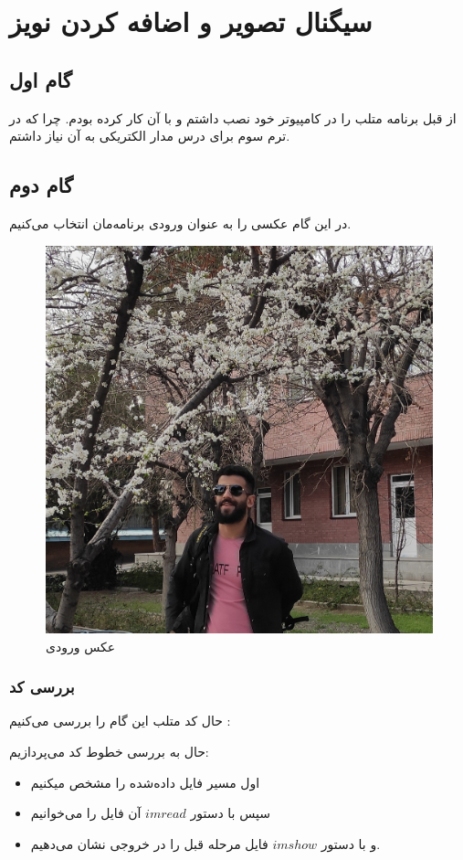 
\def \Subject {سیگنال تصویر و اضافه کردن نویز}
\def \Author {فرزان رحمانی}
\def \Session {1}
\setcounter{chapter}{\Session-1}

\chapter[\Subject]{\Subject}
\section{گام اول}
از قبل برنامه متلب را در کامپیوتر خود نصب داشتم و با آن کار کرده بودم. چرا که در ترم سوم برای درس مدار الکتریکی به آن نیاز داشتم.
\section{گام دوم}
در این گام عکسی را به عنوان ورودی برنامه‌مان انتخاب می‌کنیم.
\begin{figure}[H]
    \centering
    \includegraphics[width=0.65\linewidth]{images/farzan.jpg}
    \caption{عکس ورودی}
    \label{fig:h}
\end{figure}
\subsection{بررسی کد}
حال کد متلب این گام را بررسی می‌کنیم
:

\lr{}

حال به بررسی خطوط کد می‌پردازیم:
\begin{itemize}
    \item اول مسیر فایل داده‌شده را مشخص میکنیم
    \item سپس با دستور 
    \(imread\)
     آن فایل را می‌خوانیم
    \item
    و با دستور
    \(imshow\)
    فایل مرحله قبل را در خروجی نشان می‌دهیم.
\end{itemize}


